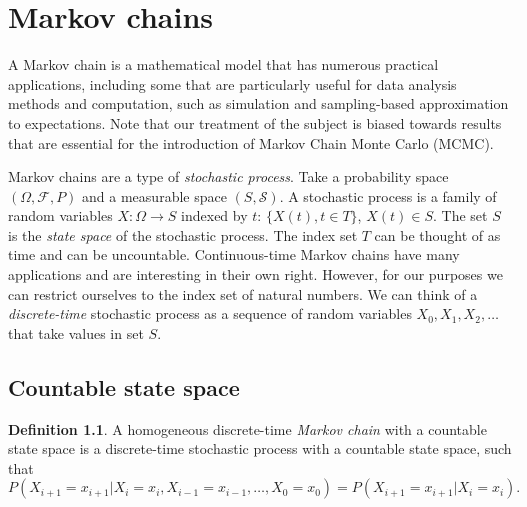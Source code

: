 \documentclass{book}
\theoremstyle{plain}%
\theoremstyle{definition}
\newtheorem{definition}{Definition}[section]
\newlength{\arrow}
\begin{document}
%
%
%
%
%
%

\chapter{Markov chains}\label{sec:markov}

A Markov chain is a mathematical model that has numerous practical applications, including some that are particularly useful for data analysis methods and computation, such as simulation and sampling-based approximation to expectations. Note that our treatment of the subject is biased towards results that are essential for the introduction of Markov Chain Monte Carlo (MCMC).

Markov chains are a type of \textit{stochastic process}. Take a probability space $(\Omega, \mathcal{F}, P)$ and a measurable space $(S, \mathcal{S})$. A stochastic process is a family of random variables $X: \Omega \rightarrow S$ indexed by $t$: $\{X(t), t \in T\}$, $X(t) \in S$. The set $S$ is the \emph{state space} of the stochastic process. The index set $T$ can be thought of as time and can be uncountable. Continuous-time Markov chains have many applications and are interesting in their own right. However, for our purposes we can restrict ourselves to the index set of natural numbers. We can think of a \textit{discrete-time} stochastic process as a sequence of random variables $X_{0}, X_{1}, X_{2}, \dots$ that take values in set $S$.

\section{Countable state space}

\begin{definition} A homogeneous discrete-time \emph{Markov chain} with a countable state space is a discrete-time stochastic process with a countable state space, such that
$$P(X_{i+1} = x_{i+1} | X_{i} = x_{i}, X_{i-1} = x_{i-1},\dots, X_0 = x_0) = P(X_{i+1} = x_{i+1}|X_{i} = x_{i}).$$
\end{definition}
\end{document}
